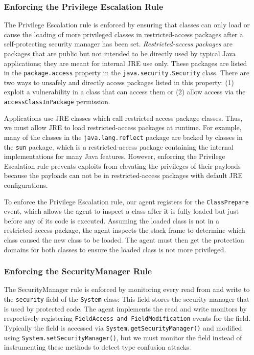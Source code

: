 \documentclass{sig-alternate}
\begin{document}
\subsubsection{Enforcing the Privilege Escalation Rule}\label{sub:Enforcing-the-Privilege}

The Privilege Escalation rule is enforced by ensuring that classes
can only load or cause the loading of more privileged classes in restricted-access
packages after a self-protecting security manager has been set. \textit{Restricted-access
packages} are packages that are public but not intended to be directly
used by typical Java applications; they are meant for internal JRE
use only. These packages are listed in the \texttt{package.access}
property in the \texttt{java.security.Security} class. There are two
ways to unsafely and directly access packages listed in this property:
(1) exploit a vulnerability in a class that can access them or (2)
allow access via the \texttt{accessClassInPackage} permission.

Applications use JRE classes which call restricted access package
classes. Thus, we must allow JRE to load restricted-access packages
at runtime. For example, many of the classes in the \texttt{java.lang.reflect}
package are backed by classes in the \texttt{sun} package, which is
a restricted-access package containing the internal implementations
for many Java features. However, enforcing the Privilege Escalation
rule prevents exploits from elevating the privileges of their payloads
because the payloads can not be in restricted-access packages with
default JRE configurations. 

To enforce the Privilege Escalation rule, our agent registers for
the \texttt{ClassPrepare} event, which allows the agent to inspect
a class after it is fully loaded but just before any of its code is
executed. Assuming the loaded class is not in a restricted-access
package, the agent inspects the stack frame to determine which class
caused the new class to be loaded. The agent must then get the protection
domains for both classes to ensure the loaded class is not more privileged.

\subsubsection{Enforcing the SecurityManager Rule}\label{sub:Enforcing-the-SecurityManager}

The SecurityManager rule is enforced by monitoring every read from
and write to the \texttt{security} field of the \texttt{System} class:
This field stores the security manager that is used by protected code.
The agent implements the read and write monitors by respectively registering
\texttt{FieldAccess and FieldModification} events for the field. Typically
the field is accessed via \texttt{System.getSecurityManager()}
and modified using \texttt{System.setSecurityManager()}, but we must
monitor the field instead of instrumenting these methods to detect
type confusion attacks. 
\end{document}
